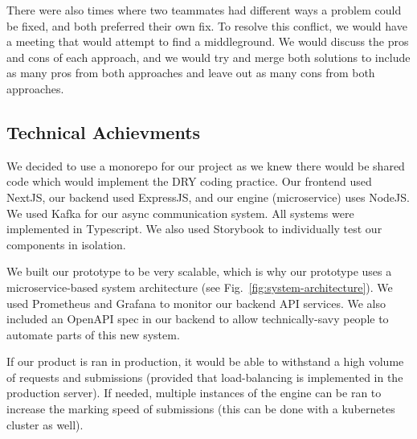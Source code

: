 \documentclass[a4paper, 12pt]{article}
\begin{document}
There were also times where two teammates had different ways a problem could be fixed, and both preferred their own fix. To resolve this conflict, we would have a meeting that would attempt to find a middleground. We would discuss the pros and cons of each approach, and we would try and merge both solutions to include as many pros from both approaches and leave out as many cons from both approaches.

\subsection*{Technical Achievments}
We decided to use a monorepo for our project as we knew there would be shared code which would implement the DRY coding practice. Our frontend used NextJS, our backend used ExpressJS, and our engine (microservice) uses NodeJS. We used Kafka for our async communication system. All systems were implemented in Typescript. We also used Storybook to individually test our components in isolation.

We built our prototype to be very scalable, which is why our prototype uses a microservice-based system architecture (see Fig.~\ref{fig:system-architecture}). We used Prometheus and Grafana to monitor our backend API services. We also included an OpenAPI spec in our backend to allow technically-savy people to automate parts of this new system.


If our product is ran in production, it would be able to withstand a high volume of requests and submissions (provided that load-balancing is implemented in the production server). If needed, multiple instances of the engine can be ran to increase the marking speed of submissions (this can be done with a kubernetes cluster as well).
\end{document}
